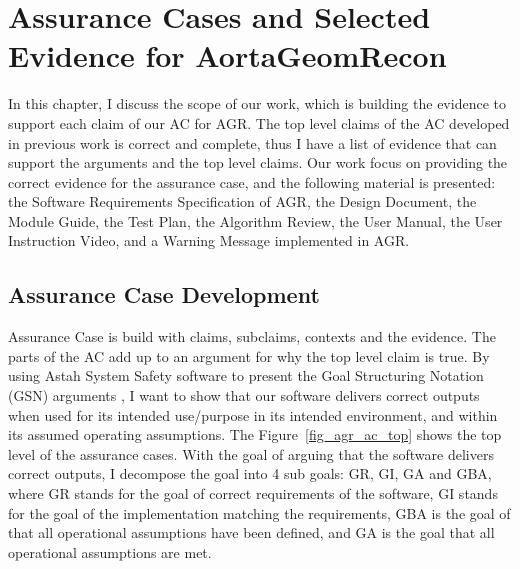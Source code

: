 \chapter{Assurance Cases and Selected Evidence for AortaGeomRecon}

In this chapter, I discuss the scope of our work, which is building the evidence to support each claim of our AC  for AGR. The top level claims of the AC developed in previous work \cite{scs_ac} is correct and complete, thus I have a list of evidence that can support the arguments and the top level claims. Our work focus on providing the correct evidence for the assurance case, and the following material is presented: the Software Requirements Specification of AGR, the Design Document, the Module Guide, the Test Plan, the Algorithm Review,  the User Manual, the User Instruction Video, and a Warning  Message implemented  in AGR.

\section{Assurance Case Development}

Assurance Case is build with claims, subclaims, contexts and the evidence. The parts of  the AC  add up  to an argument for why the top level claim is true. By using Astah System Safety software to present the Goal Structuring Notation (GSN) arguments \cite{Astah_2023}\cite{kelly2004goal}, I want to show that our software delivers correct outputs when used for its intended use/purpose in its intended environment, and within its assumed operating assumptions. The Figure~\ref{fig_agr_ac_top} shows the top level of the assurance cases. With the goal of arguing that the software delivers correct outputs, I decompose the goal into 4 sub goals: GR, GI, GA and GBA, where GR stands for the goal of correct requirements of the software, GI stands for the goal of the implementation  matching the requirements, GBA is the goal of  that all  operational assumptions have been defined, and GA is the goal that all operational assumptions are met.

